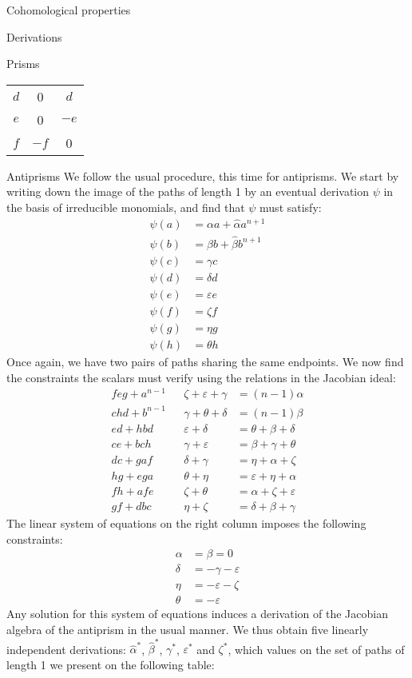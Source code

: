 \begin{chapter}{Cohomological properties}
\begin{section}{Derivations}
\begin{subsection}{Prisms}
\begin{center}
\begin{tabular}{ c | c | c }
$d$ & 	0		& $d$	\\
$e$ & 0		& $-e$ \\
$f$ & $-f$		& 0
\end{tabular}
\end{center}
\end{subsection}
\begin{subsection}{Antiprisms}
We follow the usual procedure, this time for antiprisms. We start by writing down the image of the paths of length 1 by an eventual derivation $\psi$ in the basis of irreducible monomials, and find that $\psi$ must satisfy:
\begin{align*}
\psi(a) &= \alpha a +\hat\alpha a^{n+1}\\
\psi(b) &= \beta b + \hat\beta b^{n+1}\\
\psi(c) &= \gamma c \\
\psi(d) &= \delta d \\
\psi(e) &= \varepsilon e \\
\psi(f) &= \zeta f \\
\psi(g) &= \eta g \\
\psi(h) &= \theta h
\end{align*}
Once again, we have two pairs of paths sharing the same endpoints. We now find the constraints the scalars must verify using the relations in the Jacobian ideal:
\begin{align*}
feg+a^{n-1} &  	&\zeta+\varepsilon+\gamma 	&=(n-1)\alpha\\
chd+b^{n-1}  &  	&\gamma+\theta+\delta 		&=(n-1)\beta\\
ed+hbd	&	&\varepsilon+\delta		&=\theta+\beta+\delta\\
ce+bch	&	&\gamma+\varepsilon		&=\beta+\gamma+\theta\\
dc+gaf	&	&\delta+\gamma			&=\eta+\alpha+\zeta\\
hg+ega	&	&\theta+\eta			&=\varepsilon+\eta+\alpha\\
fh+afe	&	&\zeta+\theta			&=\alpha+\zeta+\varepsilon\\
gf+dbc	&	&\eta+\zeta				&=\delta+\beta+\gamma
\end{align*} 
The linear system of equations on the right column imposes the following constraints:
\begin{align*}
\alpha&=\beta=0\\
\delta&=-\gamma-\varepsilon\\
\eta&=-\varepsilon-\zeta\\
\theta&=-\varepsilon
\end{align*}
Any solution for this system of equations induces a derivation of the Jacobian algebra of the antiprism in the usual manner. We thus obtain five linearly independent derivations: $\hat\alpha^*$, $\hat\beta^*$, $\gamma^*$, $\varepsilon^*$ and $\zeta^*$, which values on the set of paths of length 1 we present on the following table:

\end{subsection}
\end{section}
\end{chapter}
